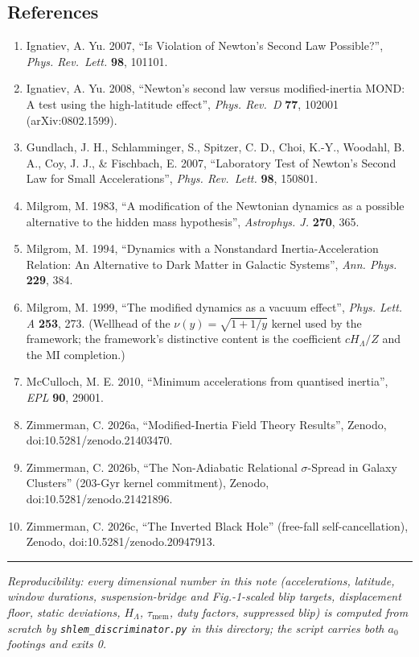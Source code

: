 \documentclass[
]{article}
\providecommand{\tightlist}{%
  \setlength{\itemsep}{0pt}\setlength{\parskip}{0pt}}
\begin{document}
\subsection{References}\label{references}

\begin{enumerate}
\def\labelenumi{\arabic{enumi}.}
\tightlist
\item
  Ignatiev, A. Yu. 2007, ``Is Violation of Newton's Second Law
  Possible?'', \emph{Phys. Rev.~Lett.} \textbf{98}, 101101.
\item
  Ignatiev, A. Yu. 2008, ``Newton's second law versus modified-inertia
  MOND: A test using the high-latitude effect'', \emph{Phys. Rev.~D}
  \textbf{77}, 102001 (arXiv:0802.1599).
\item
  Gundlach, J. H., Schlamminger, S., Spitzer, C. D., Choi, K.-Y.,
  Woodahl, B. A., Coy, J. J., \& Fischbach, E. 2007, ``Laboratory Test
  of Newton's Second Law for Small Accelerations'', \emph{Phys.
  Rev.~Lett.} \textbf{98}, 150801.
\item
  Milgrom, M. 1983, ``A modification of the Newtonian dynamics as a
  possible alternative to the hidden mass hypothesis'', \emph{Astrophys.
  J.} \textbf{270}, 365.
\item
  Milgrom, M. 1994, ``Dynamics with a Nonstandard Inertia-Acceleration
  Relation: An Alternative to Dark Matter in Galactic Systems'',
  \emph{Ann. Phys.} \textbf{229}, 384.
\item
  Milgrom, M. 1999, ``The modified dynamics as a vacuum effect'',
  \emph{Phys. Lett. A} \textbf{253}, 273. (Wellhead of the
  \(\nu(y)=\sqrt{1+1/y}\) kernel used by the framework; the framework's
  distinctive content is the coefficient \(cH_\Lambda/Z\) and the MI
  completion.)
\item
  McCulloch, M. E. 2010, ``Minimum accelerations from quantised
  inertia'', \emph{EPL} \textbf{90}, 29001.
\item
  Zimmerman, C. 2026a, ``Modified-Inertia Field Theory Results'',
  Zenodo, doi:10.5281/zenodo.21403470.
\item
  Zimmerman, C. 2026b, ``The Non-Adiabatic Relational \(\sigma\)-Spread
  in Galaxy Clusters'' (203-Gyr kernel commitment), Zenodo,
  doi:10.5281/zenodo.21421896.
\item
  Zimmerman, C. 2026c, ``The Inverted Black Hole'' (free-fall
  self-cancellation), Zenodo, doi:10.5281/zenodo.20947913.
\end{enumerate}

\begin{center}\rule{0.5\linewidth}{0.5pt}\end{center}

\emph{Reproducibility: every dimensional number in this note
(accelerations, latitude, window durations, suspension-bridge and
Fig.-1-scaled blip targets, displacement floor, static deviations,
\(H_\Lambda\), \(\tau_\mathrm{mem}\), duty factors, suppressed blip) is
computed from scratch by \texttt{shlem\_discriminator.py} in this
directory; the script carries both \(a_0\) footings and exits 0.}
\end{document}
